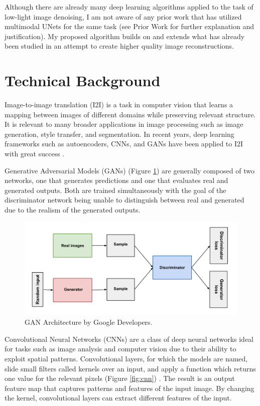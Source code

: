 \documentclass[10pt,twocolumn]{article}
\begin{document}
Although there are already many deep learning algorithms applied to the task of low-light image denoising, I am not aware of any prior work that has utilized multimodal UNets for the same task (see Prior Work for further explanation and justification). My proposed algorithm builds on and extends what has already been studied in an attempt to create higher quality image reconstructions.


\section{Technical Background}

Image-to-image translation (I2I) is a task in computer vision that learns a mapping between images of different domains while preserving relevant structure. It is relevant to many broader applications in image processing such as image generation, style transfer, and segmentation. In recent years, deep learning frameworks such as autoencoders, CNNs, and GANs have been applied to I2I with great success \cite{i2i}.

Generative Adversarial Models (GANs) (Figure \ref{fig:gan}) are generally composed of two networks, one that generates predictions and one that evaluates real and generated outputs. Both are trained simultaneously with the goal of the discriminator network being unable to distinguish between real and generated due to the realism of the generated outputs.

\begin{figure}[h]
	\centering
        \includegraphics[scale=0.3]{gan}
	\caption{GAN Architecture by Google Developers.}
	\label{fig:gan}
\end{figure}

Convolutional Neural Networks (CNNs) are a class of deep neural networks ideal for tasks such as image analysis and computer vision due to their ability to exploit spatial patterns. Convolutional layers, for which the models are named, slide small filters called kernels over an input, and apply a function which returns one value for the relevant pixels (Figure \ref{fig:cnn}) \cite{cnn}. The result is an output feature map that captures patterns and features of the input image. By changing the kernel, convolutional layers can extract different features of the input.
\end{document}
